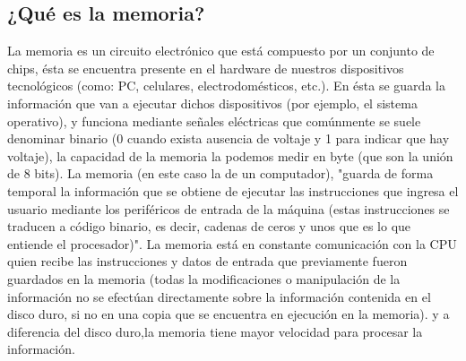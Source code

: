 \documentclass{article}
\begin{document}
\subsection{¿Qué es la memoria?} \label{contenido}
La memoria es un circuito electrónico que está compuesto por un conjunto de chips, ésta se encuentra presente en el hardware de nuestros dispositivos tecnológicos (como: PC, celulares, electrodomésticos, etc.). En ésta se guarda la información que van a ejecutar dichos dispositivos (por ejemplo, el sistema operativo), y funciona mediante señales eléctricas que comúnmente se suele denominar binario (0 cuando exista ausencia de voltaje y 1 para indicar que hay voltaje), la capacidad de la memoria la podemos medir en byte (que son la unión de 8 bits). La memoria (en este caso la de un computador), "guarda de forma temporal la información que se obtiene de ejecutar las instrucciones que ingresa el usuario mediante los periféricos de entrada de la máquina (estas instrucciones se traducen a código binario, es decir, cadenas de ceros y unos que es lo que entiende el procesador)"\cite{Quiroga}. La memoria está en constante comunicación con la CPU quien recibe las instrucciones y datos de entrada que previamente fueron guardados en la memoria (todas la modificaciones o manipulación de la información no se efectúan directamente sobre la información contenida en el disco duro, si no en una copia que se encuentra en ejecución en la memoria). y a diferencia del disco duro,la memoria tiene mayor velocidad para procesar la información. 
\end{document}
